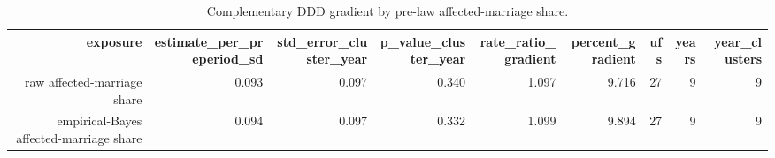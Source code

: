 \begin{table}[!htbp]
\centering
\caption{Complementary DDD gradient by pre-law affected-marriage share.} 
\label{tab:exposure_ddd}
\begingroup\small
\begin{tabular}{rrrrrrrrr}
  \hline
exposure & estimate\_per\_preperiod\_sd & std\_error\_cluster\_year & p\_value\_cluster\_year & rate\_ratio\_gradient & percent\_gradient & ufs & years & year\_clusters \\ 
  \hline
raw affected-marriage share & 0.093 & 0.097 & 0.340 & 1.097 & 9.716 &   27 &    9 &    9 \\ 
  empirical-Bayes affected-marriage share & 0.094 & 0.097 & 0.332 & 1.099 & 9.894 &   27 &    9 &    9 \\ 
   \hline
\end{tabular}
\endgroup
\end{table}
